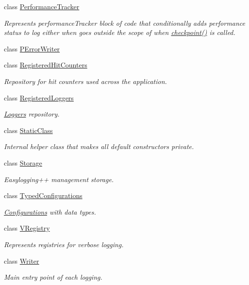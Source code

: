 \begin{DoxyCompactItemize}
class \hyperlink{a00065}{Performance\+Tracker}
\begin{DoxyCompactList}\small\item\em Represents performance\+Tracker block of code that conditionally adds performance status to log either when goes outside the scope of when \hyperlink{a00065_aec9a6e149674c5782cc855e49aeb0aaf}{checkpoint()} is called. \end{DoxyCompactList}\item 
class \hyperlink{a00068}{P\+Error\+Writer}
\item 
class \hyperlink{a00071}{Registered\+Hit\+Counters}
\begin{DoxyCompactList}\small\item\em Repository for hit counters used across the application. \end{DoxyCompactList}\item 
class \hyperlink{a00072}{Registered\+Loggers}
\begin{DoxyCompactList}\small\item\em \hyperlink{a00049}{Loggers} repository. \end{DoxyCompactList}\item 
class \hyperlink{a00084}{Static\+Class}
\begin{DoxyCompactList}\small\item\em Internal helper class that makes all default constructors private. \end{DoxyCompactList}\item 
class \hyperlink{a00086}{Storage}
\begin{DoxyCompactList}\small\item\em Easylogging++ management storage. \end{DoxyCompactList}\item 
class \hyperlink{a00092}{Typed\+Configurations}
\begin{DoxyCompactList}\small\item\em \hyperlink{a00014}{Configurations} with data types. \end{DoxyCompactList}\item 
class \hyperlink{a00094}{V\+Registry}
\begin{DoxyCompactList}\small\item\em Represents registries for verbose logging. \end{DoxyCompactList}\item 
class \hyperlink{a00097}{Writer}
\begin{DoxyCompactList}\small\item\em Main entry point of each logging. \end{DoxyCompactList}\end{DoxyCompactItemize}
